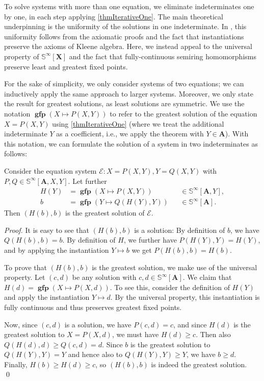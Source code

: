 \documentclass[english,runningheads,a4paper,envcountsame]{llncs}
\DeclareMathOperator{\gfp}{\mathbf{gfp}}
\newcommand{\Sinf}{{\mathbb S}^{\infty}}
\newcommand*{\XX}{{\bm X}}
\newcommand*{\EE}{\mathcal{E}}
\renewcommand{\AA}{{\bm A}}
\newcommand*{\co}{\colon}
\begin{document}
To solve systems with more than one equation, we eliminate indeterminates one by one, in each step applying \cref{thmIterativeOne}.
The main theoretical underpinning is the uniformity of the solutions in one indeterminate.
In \cite{Kleene}, this uniformity follows from the axiomatic proofs and the fact that instantiations preserve the axioms of Kleene algebra.
Here, we instead appeal to the universal property of $\Sinf[\XX]$ and the fact that fully-continuous semiring homomorphisms preserve least and greatest fixed points.

For the sake of simplicity, we only consider systems of two equations; we can inductively apply the same approach to larger systems.
Moreover, we only state the result for greatest solutions, as least solutions are symmetric.
We use the notation $\gfp(X \mapsto P(X,Y))$ to refer to the greatest solution of the equation $X = P(X,Y)$ using \cref{thmIterativeOne} (where we treat the additional indeterminate $Y$ as a coefficient, i.e., we apply the theorem with $Y \in \AA$).
With this notation, we can formulate the solution of a system in two indeterminates as follows:

\begin{theorem}\label{thmIterativeTwo}
Consider the equation system $\EE \co X=P(X,Y), Y=Q(X,Y)$ with $P,Q \in \Sinf[\AA,X,Y]$.
Let further
\begin{align*}
    H(Y) &= \gfp(X \mapsto P(X,Y)) && \in \Sinf[\AA,Y], \\
    b &= \gfp(Y \mapsto Q(H(Y),Y)) && \in \Sinf[\AA].
\end{align*}
Then $(H(b), b)$ is the greatest solution of $\EE$.
\end{theorem}

\begin{proof}
It is easy to see that $(H(b),b)$ is a solution:
By definition of $b$, we have $Q(H(b),b) = b$.
By definition of $H$, we further have $P(H(Y),Y) = H(Y)$, and by applying the instantiation $Y \mapsto b$ we get $P(H(b),b) = H(b)$.

To prove that $(H(b),b)$ is the greatest solution, we make use of the universal property.
Let $(c,d)$ be any solution with $c,d \in \Sinf[\AA]$.
We claim that $H(d) = \gfp(X \mapsto P(X,d))$.
To see this, consider the definition of $H(Y)$ and apply the instantiation $Y \mapsto d$.
By the universal property, this instantiation is fully continuous and thus preserves greatest fixed points.

Now, since $(c,d)$ is a solution, we have $P(c,d) = c$, and since $H(d)$ is the greatest solution to $X = P(X,d)$, we must have $H(d) \ge c$.
Then also $Q(H(d),d) \ge Q(c,d) = d$.
Since $b$ is the greatest solution to $Q(H(Y),Y) = Y$ and hence also to $Q(H(Y),Y) \ge Y$, we have $b \ge d$.
Finally, $H(b) \ge H(d) \ge c$, so $(H(b),b)$ is indeed the greatest solution. \qed
\end{proof}
\end{document}
